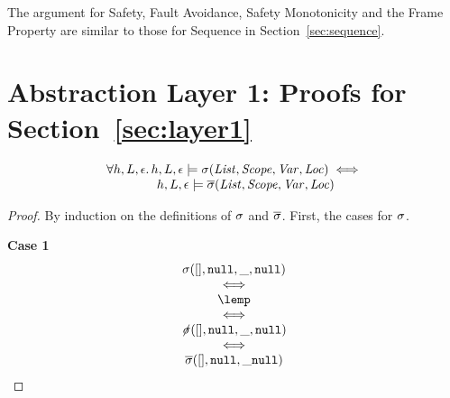 \documentclass{article}
\begin{document}
The argument for Safety, Fault Avoidance, Safety Monotonicity and the Frame Property are similar to those for Sequence in Section~\ref{sec:sequence}.




\section{Abstraction Layer 1: Proofs for Section~\ref{sec:layer1}}
\label{sec:abslayer1}


\begin{lemma}
        \label{lemma:scopeprimeproof}
        \[ \begin{array}{l}
                \forall h,L,\epsilon \mathpunct{.} h,L,\epsilon\models \sigma({\mathit{List}},{\mathit{Scope}},{\mathit{Var}},{\mathit{Loc}}) \iff\\
                \qquad\qquad h,L,\epsilon\models \overline{\sigma}({\mathit{List}},{\mathit{Scope}},{\mathit{Var}},{\mathit{Loc}})
        \end{array}\]

        \begin{proof}
                By induction on the definitions of $\sigma$ and $\overline{\sigma}$. First, the cases for $\sigma$.

                \textbf{Case 1}\\
\[
\begin{array}{c}
  \scope([],\nil,\_,\nil) \\
  \iff\\
  \lemp\\
  \iff\\
  \notscope([],\nil,\_,\nil)\\
  \iff\\
  \scopepr([],\nil,\_\nil)
\end{array}
\]


\end{proof}
\end{lemma}
\end{document}
